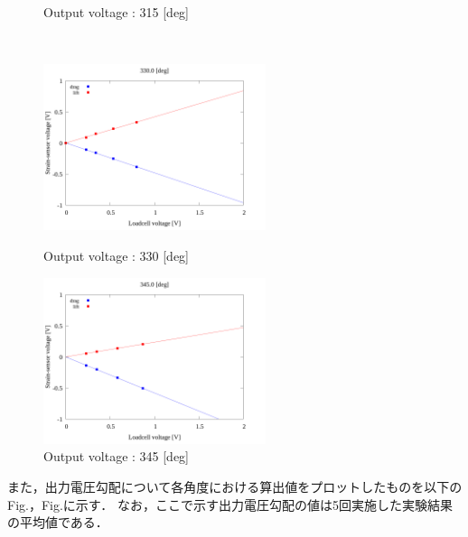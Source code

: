 \begin{figure}
\begin{minipage}[b]{0.45\linewidth}
        \caption{Output voltage : 315 [deg]}
      \end{minipage}\\
      \begin{minipage}[b]{0.45\linewidth}
        \centering
        \includegraphics[width=65mm]{../../02_workspace/result/2-1/plot/04/04_linear_3300.png}
        \caption{Output voltage : 330 [deg]}
      \end{minipage}
      \begin{minipage}[b]{0.45\linewidth}
        \centering
        \includegraphics[width=65mm]{../../02_workspace/result/2-1/plot/04/04_linear_3450.png}
        \caption{Output voltage : 345 [deg]}
      \end{minipage}
\end{figure}

\newpage

また，出力電圧勾配について各角度における算出値をプロットしたものを以下のFig.，Fig.に示す．
なお，ここで示す出力電圧勾配の値は5回実施した実験結果の平均値である．

